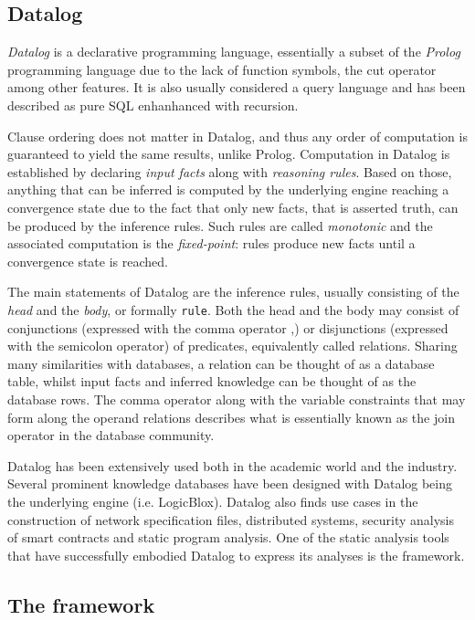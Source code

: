 \subsection{Datalog}

\textit{Datalog} is a declarative programming language, essentially a subset of the  \textit{Prolog}
programming language due to the lack of function symbols, the cut operator among
other features. It is also usually considered a query language and has been described
as pure SQL enhanhanced with recursion.

Clause ordering does not matter in Datalog, and thus any order of computation is
guaranteed to yield the same results, unlike Prolog. Computation in Datalog is
established by declaring \textit{input facts} along with \textit{reasoning rules}. Based on those,
anything that can be inferred is computed by the underlying engine reaching
a convergence state due to the fact that only new facts, that is asserted truth,
can be produced by the inference rules. Such rules are called \textit{monotonic} and
the associated computation is the \emph{fixed-point}: rules produce new facts
until a convergence state is reached.

The main statements of Datalog are the inference rules, usually consisting of
the \emph{head} and the \emph{body}, or formally \texttt{rule}. Both the head and the body
may consist of conjunctions (expressed with the comma operator ,) or
disjunctions (expressed with the semicolon operator) of predicates, equivalently called
relations. Sharing many similarities with databases, a relation can be thought
of as a database table, whilst input facts and inferred knowledge can be thought of as
the database rows. The comma operator along with the variable constraints that
may form along the operand relations describes what is essentially known
as the join operator in the database community.

Datalog has been extensively used both in the academic world and the industry. Several
prominent knowledge databases have been designed with Datalog being the underlying engine
(i.e. LogicBlox). Datalog also finds use cases in the construction of network
specification files, distributed systems, security analysis of
smart contracts\cite{grech2018madmax}
and static program analysis. One of the
static analysis tools that have successfully embodied Datalog to express its analyses
is the \doop{} framework.

\subsection{The \doop{} framework}

